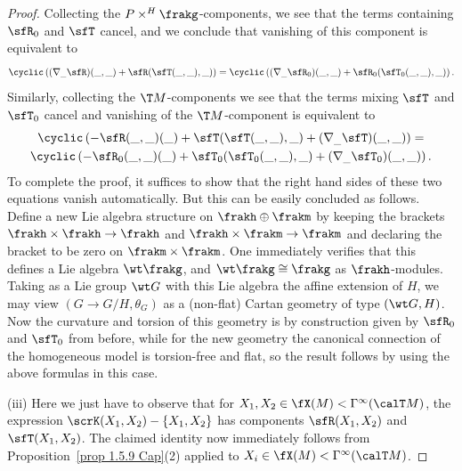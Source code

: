 \begin{proof}
    Collecting the $P\times^H\frakg$-components, we see that the terms containing $\sfR_0$ and $\sfT$ cancel, and we conclude that vanishing of this component is equivalent to 
    \[\cyclic\left((\nabla_{\_}\sfR)(\_,\_)+\sfR(\sfT(\_,\_),\_)\right)=\cyclic\left((\nabla_{\_}\sfR_0)(\_,\_)+\sfR_0(\sfT_0(\_,\_),\_)\right).\]
    Similarly, collecting the $\T M$-components we see that the terms mixing $\sfT$ and $\sfT_0$ cancel and vanishing of the $\T M$-component is equivalent to 
    \begin{multline}
        \cyclic\left(-\sfR(\_,\_)(\_)+\sfT(\sfT(\_,\_),\_)+(\nabla_{\_}\sfT)(\_,\_)\right)=\\
        \cyclic\left(-\sfR_0(\_,\_)(\_)+\sfT_0(\sfT_0(\_,\_),\_)+(\nabla_{\_}\sfT_0)(\_,\_)\right).
    \end{multline}
    To complete the proof, it suffices to show that the right hand sides of these two equations vanish automatically. But this can be easily concluded as follows. Define a new Lie algebra structure on $\frakh\oplus\frakm$ by keeping the brackets $\frakh\times\frakh\to\frakh$ and $\frakh\times\frakm\to\frakm$ and declaring the bracket to be zero on $\frakm\times\frakm$. One immediately verifies that this defines a Lie algebra $\wt\frakg$, and $\wt\frakg\cong \frakg$ as $\frakh$-modules. Taking as a Lie group $\wt G$ with this Lie algebra the affine extension of $H$, we may view $(G\to G\slash H,\theta_G)$ as a (non-flat) Cartan geometry of type $(\wt G,H)$. Now the curvature and torsion of this geometry is by construction given by $\sfR_0$ and $\sfT_0$ from before, while for the new geometry the canonical connection of the homogeneous model is torsion-free and flat, so the result follows by using the above formulas in this case.

    (iii) Here we just have to observe that for $X_1,X_2\in \fX(M)<\Gamma^\infty(\calT M)$, the expression $\scrK(X_1,X_2)-\{X_1,X_2\}$ has components $\sfR(X_1,X_2)$ and $\sfT(X_1,X_2)$. The claimed identity now immediately follows from Proposition~\ref{prop 1.5.9 Cap}(2) applied to $X_i\in\fX(M)<\Gamma^\infty(\calT M)$.
\end{proof}


